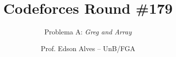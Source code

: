 \title{Codeforces Round \#179}
\subtitle{Problema A: \textit{Greg and Array}}
\author{Prof. Edson Alves -- UnB/FGA}
\date{}
